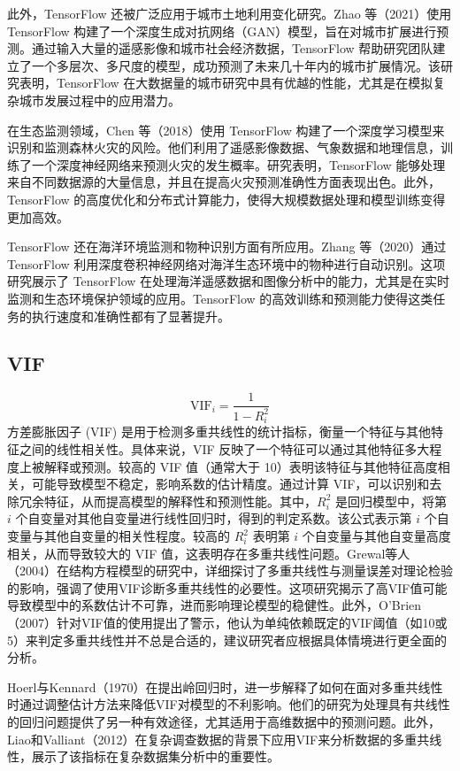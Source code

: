\documentclass[AutoFakeBold]{LZUThesis-PgD&PhD}
\begin{document}
	此外，TensorFlow 还被广泛应用于城市土地利用变化研究。Zhao 等（2021）使用 TensorFlow 构建了一个深度生成对抗网络（GAN）模型，旨在对城市扩展进行预测\cite{zhao2021}。通过输入大量的遥感影像和城市社会经济数据，TensorFlow 帮助研究团队建立了一个多层次、多尺度的模型，成功预测了未来几十年内的城市扩展情况。该研究表明，TensorFlow 在大数据量的城市研究中具有优越的性能，尤其是在模拟复杂城市发展过程中的应用潜力。
	
	在生态监测领域，Chen 等（2018）使用 TensorFlow 构建了一个深度学习模型来识别和监测森林火灾的风险\cite{chen2018}。他们利用了遥感影像数据、气象数据和地理信息，训练了一个深度神经网络来预测火灾的发生概率。研究表明，TensorFlow 能够处理来自不同数据源的大量信息，并且在提高火灾预测准确性方面表现出色。此外，TensorFlow 的高度优化和分布式计算能力，使得大规模数据处理和模型训练变得更加高效。
	
	TensorFlow 还在海洋环境监测和物种识别方面有所应用。Zhang 等（2020）通过 TensorFlow 利用深度卷积神经网络对海洋生态环境中的物种进行自动识别\cite{zhang2020}。这项研究展示了 TensorFlow 在处理海洋遥感数据和图像分析中的能力，尤其是在实时监测和生态环境保护领域的应用。TensorFlow 的高效训练和预测能力使得这类任务的执行速度和准确性都有了显著提升。
	

	\subsection{VIF}
	
	\[
	\text{VIF}_i = \frac{1}{1 - R_i^2}
	\]
	方差膨胀因子 (VIF) 是用于检测多重共线性的统计指标，衡量一个特征与其他特征之间的线性相关性。具体来说，VIF 反映了一个特征可以通过其他特征多大程度上被解释或预测。较高的 VIF 值（通常大于 10）表明该特征与其他特征高度相关，可能导致模型不稳定，影响系数的估计精度。通过计算 VIF，可以识别和去除冗余特征，从而提高模型的解释性和预测性能。其中，$R_i^2$ 是回归模型中，将第 $i$ 个自变量对其他自变量进行线性回归时，得到的判定系数。该公式表示第 $i$ 个自变量与其他自变量的相关性程度。较高的 $R_i^2$ 表明第 $i$ 个自变量与其他自变量高度相关，从而导致较大的 VIF 值，这表明存在多重共线性问题。Grewal等人（2004）在结构方程模型的研究中，详细探讨了多重共线性与测量误差对理论检验的影响，强调了使用VIF诊断多重共线性的必要性\cite{grewal2004}。这项研究揭示了高VIF值可能导致模型中的系数估计不可靠，进而影响理论模型的稳健性。此外，O’Brien（2007）针对VIF值的使用提出了警示，他认为单纯依赖既定的VIF阈值（如10或5）来判定多重共线性并不总是合适的，建议研究者应根据具体情境进行更全面的分析\cite{obrien2007}。
	
	Hoerl与Kennard（1970）在提出岭回归时，进一步解释了如何在面对多重共线性时通过调整估计方法来降低VIF对模型的不利影响\cite{hoerl1970}。他们的研究为处理具有共线性的回归问题提供了另一种有效途径，尤其适用于高维数据中的预测问题。此外，Liao和Valliant（2012）在复杂调查数据的背景下应用VIF来分析数据的多重共线性，展示了该指标在复杂数据集分析中的重要性\cite{liao2012}。
	
\end{document}
